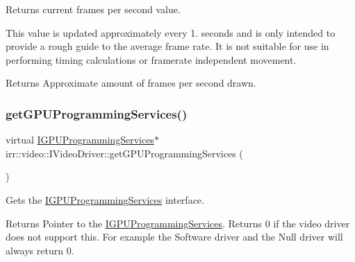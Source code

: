 Returns current frames per second value. 

This value is updated approximately every 1. seconds and is only intended to provide a rough guide to the average frame rate. It is not suitable for use in performing timing calculations or framerate independent movement. \begin{DoxyReturn}{Returns}
Approximate amount of frames per second drawn. 
\end{DoxyReturn}
\mbox{\label{classirr_1_1video_1_1IVideoDriver_ad2098a408bbe9dad8053c3f4aea7d856}} 
\subsubsection{\texorpdfstring{get\+G\+P\+U\+Programming\+Services()}{getGPUProgrammingServices()}}
{\footnotesize\ttfamily virtual \hyperlink{classirr_1_1video_1_1IGPUProgrammingServices}{I\+G\+P\+U\+Programming\+Services}$\ast$ irr\+::video\+::\+I\+Video\+Driver\+::get\+G\+P\+U\+Programming\+Services (\begin{DoxyParamCaption}{ }\end{DoxyParamCaption})\hspace{0.3cm}{\ttfamily [pure virtual]}}



Gets the \hyperlink{classirr_1_1video_1_1IGPUProgrammingServices}{I\+G\+P\+U\+Programming\+Services} interface. 

\begin{DoxyReturn}{Returns}
Pointer to the \hyperlink{classirr_1_1video_1_1IGPUProgrammingServices}{I\+G\+P\+U\+Programming\+Services}. Returns 0 if the video driver does not support this. For example the Software driver and the Null driver will always return 0. 
\end{DoxyReturn}
\mbox{\label{classirr_1_1video_1_1IVideoDriver_a5cc08e7cd2ce2a30275e22ce13bb1013}} 
